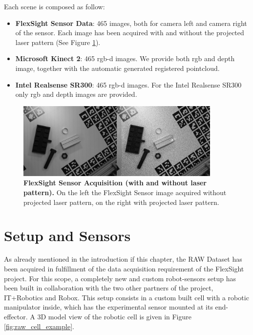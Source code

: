 Each scene is composed as follow:

\begin{itemize}
	\item \textbf{FlexSight Sensor Data}: 465 images, both for camera left and camera right of the sensor. Each image has been acquired with and without the projected laser pattern (See Figure \ref{fig:flexsight_laser_no_laser_ex}).
	\item \textbf{Microsoft Kinect 2}: 465 rgb-d images. We provide both rgb and depth image, together with the automatic generated registered pointcloud.
	\item \textbf{Intel Realsense SR300}: 465 rgb-d images. For the Intel Realsense SR300 only rgb and depth images are provided.
\end{itemize}

\begin{figure}
    \centering
    \includegraphics[width=0.9\textwidth]{figures/3_raw_dataset/flexsight_laser_no_laser_ex}
    \caption{\textbf{FlexSight Sensor Acquisition (with and without laser pattern).} On the left the FlexSight Sensor image acquired without projected laser pattern, on the right with projected laser pattern.}
    \label{fig:flexsight_laser_no_laser_ex}
\end{figure}

\section{Setup and Sensors}\label{sec:raw_setup_and_sensors}
As already mentioned in the introduction if this chapter, the RAW Dataset has been acquired in fulfillment of the data acquisition requirement of the FlexSight project. For this scope, a completely new and custom robot-sensors setup has been built in collaboration with the two other partners of the project, IT+Robotics and Robox. This setup consists in a custom built cell with a robotic manipulator inside, which has the experimental sensor mounted at its end-effector. A 3D model view of the robotic cell is given in Figure \ref{fig:raw_cell_example}.

